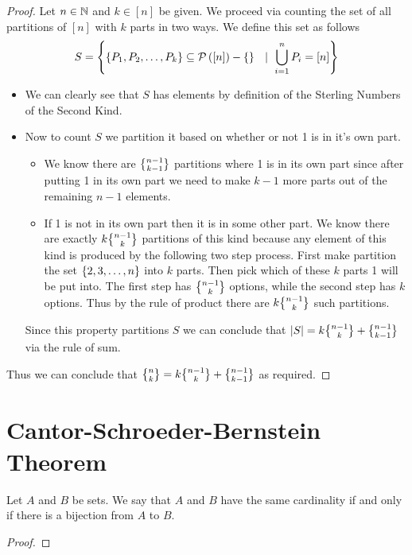        \begin{proof}
            Let $n \in \mathbb{N}$ and $k \in [n]$ be given.
            We proceed via counting the set of all partitions of $[n]$ with $k$ parts
            in two ways. We define this set as follows
            \[
                S = \left\{\left\{P_1, P_2, \dots, P_k\right\} \subseteq \mathcal{P}\left([n]\right) - \left\{\right\} \  \ \mid \ \displaystyle\bigcup_{i = 1}^{n} P_i = [n]\right\}
            \]
            \begin{itemize}
                \item
                    We can clearly see that $S$ has  elements by definition of
                    the Sterling Numbers of the Second Kind.
                \item
                    Now to count $S$ we partition it based on whether or not 1 is in
                    it's own part.
                    \begin{itemize}
                        \item
                            We know there are $\npartk{n - 1}{k - 1}$ partitions
                            where 1 is in its own part since after putting 1 in its own part we need
                            to make $k - 1$ more parts out of the remaining $n - 1$ elements.
                        \item
                            If 1 is not in its own part then it is in some other part. We
                            know there are exactly $k \npartk{n - 1}{k}$ partitions of this
                            kind because any element of this kind is produced by the following
                            two step process. First make partition the set $\left\{2, 3, \dots, n\right\}$
                            into $k$ parts. Then pick which of these $k$ parts 1 will be put into.
                            The first step has $\npartk{n - 1}{k}$ options, while the second step
                            has $k$ options. Thus by the rule of product there are $k \npartk{n - 1}{k}$
                            such partitions.
                    \end{itemize}
                    Since this property partitions $S$ we can conclude that
                    $|S| = k \npartk{n - 1}{k} + \npartk{n - 1}{k - 1}$ via the rule of sum.
            \end{itemize}
            Thus we can conclude that $\npartk{n}{k} = k \npartk{n - 1}{k} + \npartk{n - 1}{k - 1}$
            as required. \QED
        \end{proof}
    \section{Cantor-Schroeder-Bernstein Theorem}
        \begin{definition}
            Let $A$ and $B$ be sets. We say that $A$ and $B$ have the same cardinality if and
            only if there is a bijection from $A$ to $B$.
        \end{definition}
        \begin{theorem}
        \end{theorem}
        \begin{proof}
        \end{proof}
